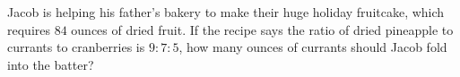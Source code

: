Jacob is helping his father's bakery to make their huge holiday fruitcake, which requires $84$ ounces of dried fruit. If the recipe says the ratio of dried pineapple to currants to cranberries is $9:7:5$, how many ounces of currants should Jacob fold into the batter?
